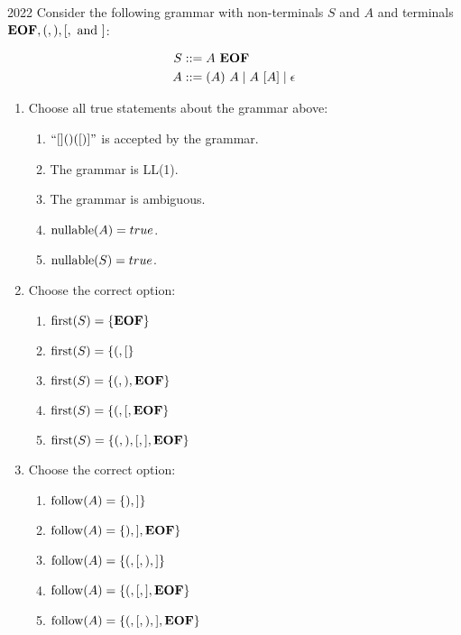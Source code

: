 \begin{exercise}{2022}
  Consider the following grammar with non-terminals \(S\) and \(A\) and
  terminals \(\mathbf{EOF}, (, ), [, \text{ and }]\):

  \begin{align*}
    S &::= A ~\mathbf{EOF} \\
    A &::= (A) ~A \mid A~[A] \mid \epsilon
  \end{align*}

  \begin{enumerate}
    \item Choose all true statements about the grammar above:
    \begin{enumerate}
      \item \(``[]()([)]"\) is accepted by the grammar.
      \item The grammar is LL(1).
      \item The grammar is ambiguous. \ifAns{\checkmark}
      \item \(\operatorname{nullable}(A) = true\). \ifAns{\checkmark}
      \item \(\operatorname{nullable}(S) = true\).
    \end{enumerate}
    \item Choose the correct option:
    \begin{enumerate}
      \item \(\operatorname{first}(S) = \{\mathbf{EOF}\}\)
      \item \(\operatorname{first}(S) = \{(, [\}\)
      \item \(\operatorname{first}(S) = \{(, ), \mathbf{EOF}\}\)
      \item \(\operatorname{first}(S) = \{(, [, \mathbf{EOF}\}\) \ifAns{\checkmark}
      \item \(\operatorname{first}(S) = \{(,), [,], \mathbf{EOF}\}\)
    \end{enumerate}
    \item Choose the correct option:
    \begin{enumerate}
      \item \(\operatorname{follow}(A) = \{), ]\}\)
      \item \(\operatorname{follow}(A) = \{), ], \mathbf{EOF}\}\)
      \item \(\operatorname{follow}(A) = \{(, [, ), ]\}\)
      \item \(\operatorname{follow}(A) = \{(, [, ], \mathbf{EOF}\}\)
      \item \(\operatorname{follow}(A) = \{(, [, ), ], \mathbf{EOF}\}\)
    \end{enumerate}
  \end{enumerate}
\end{exercise}
